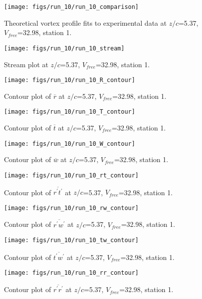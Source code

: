 \begin{figure}[H]
\centering
\texttt{[image: figs/run\_10/run\_10\_comparison]}
\caption{Theoretical vortex profile fits to experimental data at $z/c$=5.37, $V_{free}$=32.98, station 1.}
\end{figure}


\begin{figure}[H]
\centering
\texttt{[image: figs/run\_10/run\_10\_stream]}
\caption{Stream plot at $z/c$=5.37, $V_{free}$=32.98, station 1.}
\end{figure}


\begin{figure}[H]
\centering
\texttt{[image: figs/run\_10/run\_10\_R\_contour]}
\caption{Contour plot of $\overline{r}$ at $z/c$=5.37, $V_{free}$=32.98, station 1.}
\end{figure}


\begin{figure}[H]
\centering
\texttt{[image: figs/run\_10/run\_10\_T\_contour]}
\caption{Contour plot of $\overline{t}$ at $z/c$=5.37, $V_{free}$=32.98, station 1.}
\end{figure}


\begin{figure}[H]
\centering
\texttt{[image: figs/run\_10/run\_10\_W\_contour]}
\caption{Contour plot of $\overline{w}$ at $z/c$=5.37, $V_{free}$=32.98, station 1.}
\end{figure}


\begin{figure}[H]
\centering
\texttt{[image: figs/run\_10/run\_10\_rt\_contour]}
\caption{Contour plot of $\overline{r^\prime t^\prime}$ at $z/c$=5.37, $V_{free}$=32.98, station 1.}
\end{figure}


\begin{figure}[H]
\centering
\texttt{[image: figs/run\_10/run\_10\_rw\_contour]}
\caption{Contour plot of $\overline{r^\prime w^\prime}$ at $z/c$=5.37, $V_{free}$=32.98, station 1.}
\end{figure}


\begin{figure}[H]
\centering
\texttt{[image: figs/run\_10/run\_10\_tw\_contour]}
\caption{Contour plot of $\overline{t^\prime w^\prime}$ at $z/c$=5.37, $V_{free}$=32.98, station 1.}
\end{figure}


\begin{figure}[H]
\centering
\texttt{[image: figs/run\_10/run\_10\_rr\_contour]}
\caption{Contour plot of $\overline{r^\prime r^\prime}$ at $z/c$=5.37, $V_{free}$=32.98, station 1.}
\end{figure}


